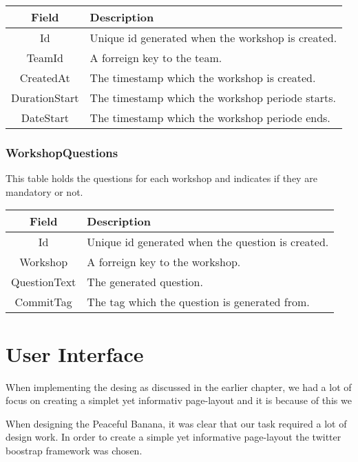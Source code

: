 \vspace{0.5cm}
\begin{tabularx}{\linewidth}{| c | X |}
    \hline
    \rowcolor[gray]{0.8}
    \textbf{Field} & \textbf{Description} \\
    \hline
    Id & Unique id generated when the workshop is created.\\ \hline
   	TeamId & A forreign key to the team.\\ \hline
   	CreatedAt & The timestamp which the workshop is created.\\ \hline
   	DurationStart & The timestamp which the workshop periode starts.\\ \hline
   	DateStart & The timestamp which the workshop periode ends.\\ 
    \hline
\end{tabularx}
\vspace{0.5cm}

\subsubsection*{WorkshopQuestions}
This table holds the questions for each workshop and indicates if they are mandatory or not. \\

\vspace{0.5cm}
\begin{tabularx}{\linewidth}{| c | X |}
    \hline
    \rowcolor[gray]{0.8}
    \textbf{Field} & \textbf{Description} \\
    \hline
    Id & Unique id generated when the question is created.\\ \hline
   	Workshop & A forreign key to the workshop.\\ \hline
   	QuestionText & The generated question.\\ \hline
   	CommitTag & The tag which the question is generated from.\\ 
    \hline
\end{tabularx}
\vspace{0.5cm}

\section{User Interface}
When implementing the desing as discussed in the earlier chapter, we had a lot of focus on creating a simplet yet informativ page-layout and it is because of this we 

When designing the Peaceful Banana, it was clear that our task required a lot of design work. In order to create a simple yet informative page-layout the twitter boostrap framework was chosen.

